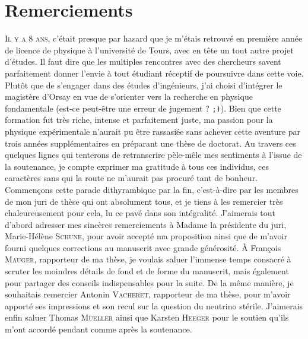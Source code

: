 

\chapter*{Remerciements}
\label{chap:remerciements}

\lettrine{I}{l y a 8 ans}, c'était presque par hasard que je m'étais retrouvé en première année de licence de physique à l'université de Tours, avec en tête un tout autre projet d'études. Il faut dire que les multiples rencontres avec des chercheurs savent parfaitement donner l'envie à tout étudiant réceptif de poursuivre dans cette voie. Plutôt que de s'engager dans des études d'ingénieurs, j'ai choisi d'intégrer le magistère d'Orsay en vue de s'orienter vers la recherche en physique fondamentale (est-ce peut-être une erreur de jugement ? {\tt ;)}). Bien que cette formation fut très riche, intense et parfaitement juste, ma passion pour la physique expérimentale n'aurait pu être rassasiée sans achever cette aventure par trois années supplémentaires en préparant une thèse de doctorat. Au travers ces quelques lignes qui tenterons de retranscrire pèle-mêle mes sentiments à l'issue de la soutenance, je compte exprimer ma gratitude à tous ces individus, ces caractères sans qui la route ne m'aurait pas procuré tant de bonheur.\\

Commençons cette parade dithyrambique par la fin, c'est-à-dire par les membres de mon juri de thèse qui ont absolument tous, et je tiens à les remercier très chaleureusement pour cela, lu ce pavé dans son intégralité. J'aimerais tout d'abord adresser mes sincères remerciements à Madame la présidente du juri, Marie-Hélène \textsc{Schune}, pour avoir accepté ma proposition ainsi que de m'avoir fourni quelques corrections au manuscrit avec grande générosité. À François \textsc{Mauger}, rapporteur de ma thèse, je voulais saluer l'immense temps consacré à scruter les moindres détails de fond et de forme du manuscrit, mais également pour partager des conseils indispensables pour la suite. De la même manière, je souhaitais remercier Antonin \textsc{Vacheret}, rapporteur de ma thèse, pour m'avoir apporté ses impressions et son recul sur la question du neutrino stérile. J'aimerais enfin saluer Thomas \textsc{Mueller} ainsi que Karsten \textsc{Heeger} pour le soutien qu'ils m'ont accordé pendant comme après la soutenance.\\

